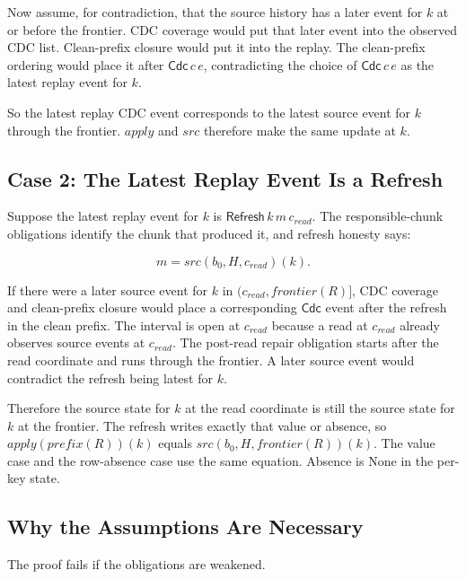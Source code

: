 \documentclass[letterpaper,10pt,twocolumn]{article}
\newcommand{\Apply}{\mathit{apply}}
\newcommand{\Src}{\mathit{src}}
\newcommand{\Frontier}{\mathit{frontier}}
\newcommand{\CleanPrefix}{\mathit{prefix}}
\newcommand{\None}{\mathrm{None}}
\begin{document}
Now assume, for contradiction, that the source history has a later event
for $k$ at or before the frontier. CDC coverage would put that
later event into the observed CDC list. Clean-prefix closure would put
it into the replay. The clean-prefix ordering would place it after
$\mathsf{Cdc}\,c\,e$, contradicting the choice of $\mathsf{Cdc}\,c\,e$ as
the latest replay event for $k$.

So the latest replay CDC event corresponds to the latest source event
for $k$ through the frontier. $\Apply$ and $\Src$
therefore make the same update at $k$.

\subsection{Case 2: The Latest Replay Event Is a
Refresh}\label{case-2-the-latest-replay-event-is-a-refresh}

Suppose the latest replay event for $k$ is
$\mathsf{Refresh}\,k\,m\,c_{\mathit{read}}$. The responsible-chunk obligations
identify the chunk that produced it, and refresh honesty says:

\[
m = \Src(b_0,H,c_{\mathit{read}})(k).
\]

If there were a later source event for $k$ in
$(c_{\mathit{read}}, \Frontier(R)]$, CDC coverage and clean-prefix
closure would place a corresponding $\mathsf{Cdc}$ event after the refresh
in the clean prefix. The interval is open at $c_{\mathit{read}}$ because a
read at $c_{\mathit{read}}$ already observes source events at
$c_{\mathit{read}}$. The post-read repair obligation starts after the read
coordinate and runs through the frontier. A later source event would
contradict the refresh being latest for $k$.

Therefore the source state for $k$ at the read coordinate is
still the source state for $k$ at the frontier. The refresh
writes exactly that value or absence, so
$\Apply(\CleanPrefix(R))(k)$ equals
$\Src(b_0,H,\Frontier(R))(k)$. The value case and the
row-absence case use the same equation. Absence is $\None$ in
the per-key state.

\subsection{Why the Assumptions Are
Necessary}\label{why-the-assumptions-are-load-bearing}

The proof fails if the obligations are weakened.
\end{document}
